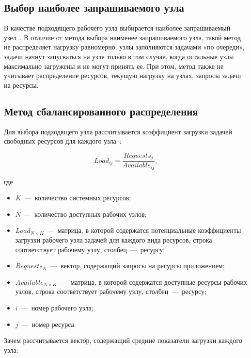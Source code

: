 \subsection{Выбор наиболее запрашиваемого узла}

В качестве подходящего рабочего узла выбирается наиболее запрашиваемый узел~\cite{liu2010performance}. В отличие от метода выбора наименее запрашиваемого узла, такой метод не распределяет нагрузку равномерно: узлы заполняются задачами «по очереди», задачи начнут запускаться на узле только в том случае, когда остальные узлы максимально загружены и не могут принять ее. При этом, метод также не учитывает распределение ресурсов, текущую нагрузку на узлах, запросы задачи на ресурсы.

\subsection{Метод сбалансированного распределения}

Для выбора подходящего узла рассчитывается коэффициент загрузки задачей свободных ресурсов для каждого узла~\cite{ghit2014balanced}\cite{kubernetesbalsched}:

\begin{equation}
	Load_{ij} = \frac{Requests_{j}}{Available_{ij}},
\end{equation}

где 

\begin{itemize}
	\item $K$~---~количество системных ресурсов;
	\item $N$~---~количество доступных рабочих узлов;
	\item $Load_{N \times K}$~---~матрица, в которой содержатся потенциальные коэффициенты загрузки рабочего узла задачей для каждого вида ресурсов, строка соответствует рабочему узлу, столбец~---~ресурсу;
	\item $Requests_{K}$~---~вектор, содержащий запросы на ресурсы приложением;
	\item $Available_{N \times K}$~---~матрица, в которой содержатся доступные ресурсы рабочих узлов, строка соответствует рабочему узлу, столбец~---~ресурсу;
	\item $i$~---~номер рабочего узла;
	\item $j$~---~номер ресурса.
\end{itemize}

Зачем рассчитывается вектор, содержащий средние показатели загрузки каждого узла:

